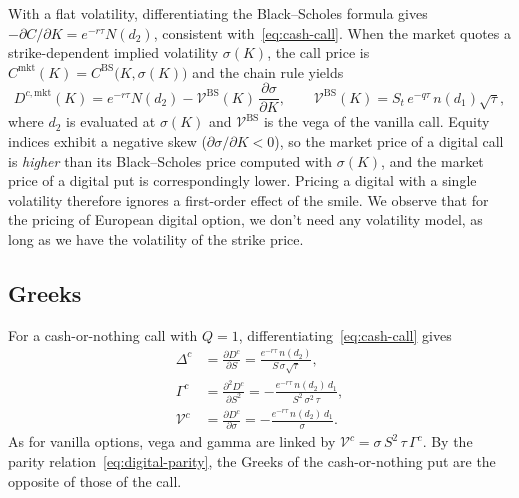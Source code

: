 \documentclass[11pt,a4paper]{article}
\theoremstyle{remark}
\begin{document}
With a flat
volatility, differentiating the Black--Scholes formula gives
$-\partial C/\partial K = e^{-r\tau}N(d_2)$, consistent
with~\eqref{eq:cash-call}. When the market quotes a strike-dependent implied
volatility $\sigma(K)$, the call price is
$C^{\mathrm{mkt}}(K) = C^{\mathrm{BS}}\bigl(K,\sigma(K)\bigr)$ and the chain rule
yields
\begin{equation}
  D^{c,\mathrm{mkt}}(K)
  = e^{-r\tau}N(d_2) - \mathcal{V}^{\mathrm{BS}}(K)\,\frac{\partial \sigma}{\partial K},
  \qquad
  \mathcal{V}^{\mathrm{BS}}(K) = S_t\,e^{-q\tau}\,n(d_1)\sqrt{\tau},
  \label{eq:smile-correction}
\end{equation}
where $d_2$ is evaluated at $\sigma(K)$ and $\mathcal{V}^{\mathrm{BS}}$ is the
vega of the vanilla call. Equity indices exhibit a negative skew
($\partial\sigma/\partial K < 0$), so the market price of a digital call is
\emph{higher} than its Black--Scholes price computed with $\sigma(K)$, and the
market price of a digital put is correspondingly lower. Pricing a digital with
a single volatility therefore ignores a first-order effect of the smile.
We observe that for the pricing of European digital option, we don't need any volatility model, as long as we have the volatility of the strike price.


\subsection{Greeks}
\label{subsubsec:bs-greeks}

For a cash-or-nothing call with $Q=1$, differentiating~\eqref{eq:cash-call}
gives
\begin{align}
  \Delta^{c} &= \frac{\partial D^{c}}{\partial S}
              = \frac{e^{-r\tau}\,n(d_2)}{S\,\sigma\sqrt{\tau}}, \label{eq:digital-delta}\\
  \Gamma^{c} &= \frac{\partial^2 D^{c}}{\partial S^2}
              = -\frac{e^{-r\tau}\,n(d_2)\,d_1}{S^2\,\sigma^2\,\tau}, \label{eq:digital-gamma}\\
  \mathcal{V}^{c} &= \frac{\partial D^{c}}{\partial \sigma}
              = -\frac{e^{-r\tau}\,n(d_2)\,d_1}{\sigma}. \label{eq:digital-vega}
\end{align}
As for vanilla options, vega and gamma are linked by
$\mathcal{V}^{c} = \sigma\,S^2\,\tau\,\Gamma^{c}$. By the parity
relation~\eqref{eq:digital-parity}, the Greeks of the cash-or-nothing put are
the opposite of those of the call.
\end{document}
